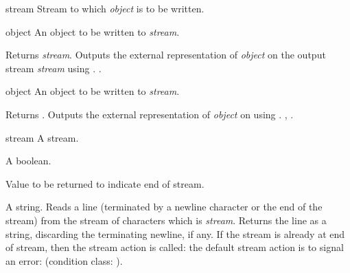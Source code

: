 \begin{optDefinition}
\begin{arguments}
    \item[stream] Stream to which {\em object\/} is to be written.
    \item[object] An object to be written to {\em stream}.
\end{arguments}
%
\result%
Returns {\em stream}.
%
\remarks%
Outputs the external representation of {\em object\/} on the output
stream {\em stream\/} using .
%
\seealso%
.

\begin{arguments}
    \item[object] An object to be written to {\em stream}.
\end{arguments}
%
\result%
Returns .
%
\remarks%
Outputs the external representation of {\em object\/} on 
using .
%
\seealso%
, .


\begin{arguments}
    \item[stream] A stream.
    \item[\optional{eos-error?}] A boolean.
    \item[\optional{eos-value}] Value to be returned to indicate end of stream.
\end{arguments}
%
\result%
A string.
%
\remarks%
Reads a line (terminated by a newline character or the end of the
stream) from the stream of characters which is {\em stream}.  Returns
the line as a string, discarding the terminating newline, if any.  If
the stream is already at end of stream, then the stream action is
called: the default stream action is to signal an error: (condition
class: ).


\end{optDefinition}
